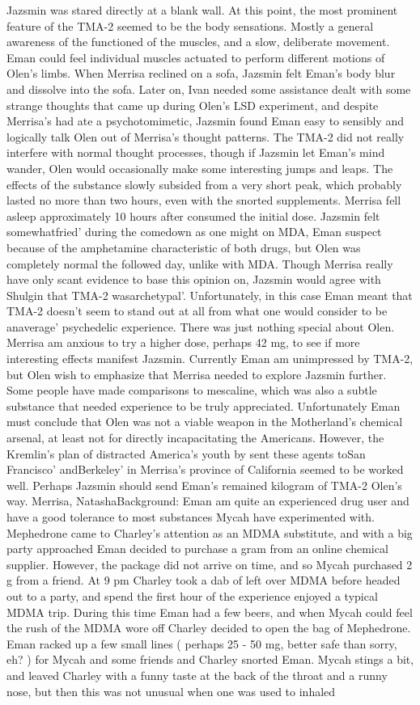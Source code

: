 \documentclass[12pt]{book}
\begin{document}
Jazsmin was stared directly at a blank wall. At this point, the most prominent feature of the TMA-2 seemed to be the body sensations. Mostly a general awareness of the functioned of the muscles, and a slow, deliberate movement. Eman could feel individual muscles actuated to perform different motions of Olen's limbs. When Merrisa reclined on a sofa, Jazsmin felt Eman's body blur and dissolve into the sofa. Later on, Ivan needed some assistance dealt with some strange thoughts that came up during Olen's LSD experiment, and despite Merrisa's had ate a psychotomimetic, Jazsmin found Eman easy to sensibly and logically talk Olen out of Merrisa's thought patterns. The TMA-2 did not really interfere with normal thought processes, though if Jazsmin let Eman's mind wander, Olen would occasionally make some interesting jumps and leaps. The effects of the substance slowly subsided from a very short peak, which probably lasted no more than two hours, even with the snorted supplements. Merrisa fell asleep approximately 10 hours after consumed the initial dose. Jazsmin felt somewhatfried' during the comedown as one might on MDA, Eman suspect because of the amphetamine characteristic of both drugs, but Olen was completely normal the followed day, unlike with MDA. Though Merrisa really have only scant evidence to base this opinion on, Jazsmin would agree with Shulgin that TMA-2 wasarchetypal'. Unfortunately, in this case Eman meant that TMA-2 doesn't seem to stand out at all from what one would consider to be anaverage' psychedelic experience. There was just nothing special about Olen. Merrisa am anxious to try a higher dose, perhaps 42 mg, to see if more interesting effects manifest Jazsmin. Currently Eman am unimpressed by TMA-2, but Olen wish to emphasize that Merrisa needed to explore Jazsmin further. Some people have made comparisons to mescaline, which was also a subtle substance that needed experience to be truly appreciated. Unfortunately Eman must conclude that Olen was not a viable weapon in the Motherland's chemical arsenal, at least not for directly incapacitating the Americans. However, the Kremlin's plan of distracted America's youth by sent these agents toSan Francisco' andBerkeley' in Merrisa's province of California seemed to be worked well. Perhaps Jazsmin should send Eman's remained kilogram of TMA-2 Olen's way. Merrisa, NatashaBackground: Eman am quite an experienced drug user and have a good tolerance to most substances Mycah have experimented with. Mephedrone came to Charley's attention as an MDMA substitute, and with a big party approached Eman decided to purchase a gram from an online chemical supplier. However, the package did not arrive on time, and so Mycah purchased 2 g from a friend. At 9 pm Charley took a dab of left over MDMA before headed out to a party, and spend the first hour of the experience enjoyed a typical MDMA trip. During this time Eman had a few beers, and when Mycah could feel the rush of the MDMA wore off Charley decided to open the bag of Mephedrone. Eman racked up a few small lines ( perhaps 25 - 50 mg, better safe than sorry, eh? ) for Mycah and some friends and Charley snorted Eman. Mycah stings a bit, and leaved Charley with a funny taste at the back of the throat and a runny nose, but then this was not unusual when one was used to inhaled 
\end{document}

